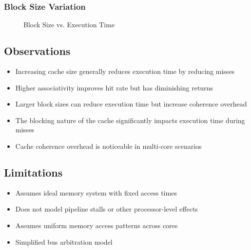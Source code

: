\documentclass{article}
\begin{document}
\subsubsection{Block Size Variation}
\begin{figure}[H]
    \centering
    \caption{Block Size vs. Execution Time}
\end{figure}

\subsection{Observations}
\begin{itemize}
    \item Increasing cache size generally reduces execution time by reducing misses
    \item Higher associativity improves hit rate but has diminishing returns
    \item Larger block sizes can reduce execution time but increase coherence overhead
    \item The blocking nature of the cache significantly impacts execution time during misses
    \item Cache coherence overhead is noticeable in multi-core scenarios
\end{itemize}

\subsection{Limitations}
\begin{itemize}
    \item Assumes ideal memory system with fixed access times
    \item Does not model pipeline stalls or other processor-level effects
    \item Assumes uniform memory access patterns across cores
    \item Simplified bus arbitration model
\end{itemize}
\end{document}
